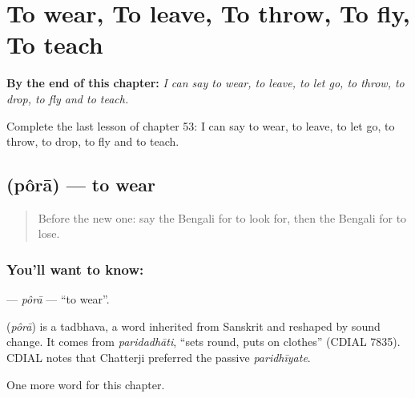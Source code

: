 
\chapter{To wear, To leave, To throw, To fly, To teach}
\label{ch:bn-to-wear-to-leave-to-throw-to-fly-to-teach}

\begin{chapteropening}
\textbf{By the end of this chapter:} \emph{I can say to wear, to leave, to let go, to throw, to drop, to fly and to teach.}

Complete the last lesson of chapter 53: I can say to wear, to leave, to let go, to throw, to drop, to fly and to teach.
\end{chapteropening}

\section[\texorpdfstring{\bn{পরা} (pôrā)}{পরা (pôrā)}]{ (pôrā) — to wear}

\label{lesson:BN-C53-pora}



\begin{quote}
Before the new one: say the Bengali for to look for, then the Bengali for to lose.
\end{quote}

\subsection*{You'll want to know: }
\textbf{} — \emph{pôrā} — \textquotedblleft{}to wear\textquotedblright{}.

\begin{cousinweb}
\textbf{} (\emph{pôrā}) is a tadbhava, a word inherited from Sanskrit and reshaped by sound change. It comes from \emph{paridadhāti}, \textquotedblleft{}sets round, puts on clothes\textquotedblright{} (CDIAL 7835). CDIAL notes that Chatterji preferred the passive \emph{paridhīyate}.
\end{cousinweb}

\begin{grammarlens}[title={What you've built}]
One more word for this chapter.
\end{grammarlens}

